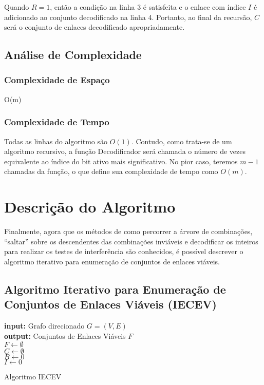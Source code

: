 Quando $R=1$, então a condição na linha 3 é satisfeita e o enlace com índice $I$ é adicionado ao conjunto decodificado na linha 4. Portanto, ao final da recursão, $C$ será o conjunto de enlaces decodificado apropriadamente.

\subsection{Análise de Complexidade}

\subsubsection{Complexidade de Espaço}

O(m)

\subsubsection{Complexidade de Tempo}

Todas as linhas do algoritmo são $O(1)$. Contudo, como trata-se de um algoritmo recursivo, a função Decodificador será chamada o número de vezes equivalente ao índice do bit ativo mais significativo. No pior caso, teremos $m-1$ chamadas da função, o que define sua complexidade de tempo como $O(m)$.

\section{Descrição do Algoritmo}

Finalmente, agora que os métodos de como percorrer a árvore de combinações, “saltar” sobre os descendentes das combinações inviáveis e decodificar os inteiros para realizar os testes de interferência são conhecidos, é possível descrever o algoritmo iterativo para enumeração de conjuntos de enlaces viáveis.

\subsection{Algoritmo Iterativo para Enumeração de Conjuntos de Enlaces Viáveis (IECEV)}

\begin{algorithm}[h]
	\SetVline
	{\bf input:} Grafo direcionado $G=(V,E)$\\
	{\bf output:} Conjuntos de Enlaces Viáveis $F$\\
	$F \leftarrow \emptyset$\\
	$C \leftarrow \emptyset$\\
	$B \leftarrow 0$\\
	$I \leftarrow 0$\\
\caption{Algoritmo IECEV}
\label{alg:iterativo}
\end{algorithm}

